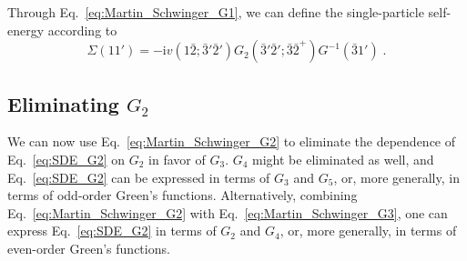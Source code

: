 \documentclass[aip,jcp,reprint,noshowkeys,superscriptaddress]{revtex4-1}
\newcommand{\ii}{\mathrm{i}}
\begin{document}
Through Eq.~\eqref{eq:Martin_Schwinger_G1}, we can define the single-particle
self-energy according to 
\begin{equation}
	\Sigma(11')
	=
	-\ii
	v(1\bar2;\bar3'\bar2')
	G_2(\bar3'\bar2';\bar3\bar2^+)
	G^{-1}(\bar3 1') \;.
	\label{eq:SDE_G2}
\end{equation}

\subsection{Eliminating $G_2$}
\label{sec:eliminating}
We can now use Eq.~\eqref{eq:Martin_Schwinger_G2}
to eliminate the dependence of 
Eq.~\eqref{eq:SDE_G2} on $G_2$ in favor of $G_3$. 
$G_4$ might be eliminated as well, 
and Eq.~\eqref{eq:SDE_G2} can be expressed in terms 
of $G_3$ and $G_5$, or, more generally, in terms 
of odd-order Green's functions. Alternatively,
combining
Eq.~\eqref{eq:Martin_Schwinger_G2} with 
Eq.~\eqref{eq:Martin_Schwinger_G3}, one can express 
Eq.~\eqref{eq:SDE_G2} in terms of $G_2$ and $G_4$,
or, more generally, in terms 
of even-order Green's functions.
\end{document}

